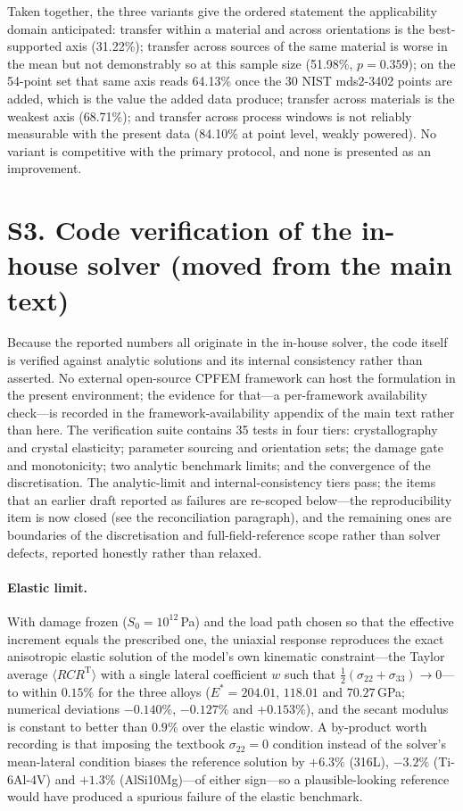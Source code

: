 \documentclass[12pt,a4paper,twocolumn]{article}
\begin{document}
Taken together, the three variants give the ordered statement the applicability domain anticipated:
transfer within a material and across orientations is the best-supported axis (31.22\%); transfer across
sources of the same material is worse in the mean but not demonstrably so at this sample size (51.98\%,
$p = 0.359$); on the 54-point set that same axis reads 64.13\% once the 30 NIST mds2-3402 points are added, which is the value the added data produce; transfer across materials is the weakest axis (68.71\%); and transfer across process windows
is not reliably measurable with the present data (84.10\% at point level, weakly powered). No variant is
competitive with the primary protocol, and none is presented as an improvement.

\section*{S3. Code verification of the in-house solver (moved from the main text)}

Because the reported numbers all originate in the in-house solver, the code itself is verified against
analytic solutions and its internal consistency rather than asserted. No external open-source CPFEM
framework can host the formulation in the present environment; the evidence for that---a per-framework
availability check---is recorded in the framework-availability appendix of the main text rather than here.
The verification suite contains 35 tests in four tiers: crystallography and crystal elasticity; parameter
sourcing and orientation sets; the damage gate and monotonicity; two analytic benchmark limits; and the
convergence of the discretisation. The analytic-limit and internal-consistency tiers pass; the items that an
earlier draft reported as failures are re-scoped below---the reproducibility item is now closed (see the
reconciliation paragraph), and the remaining ones are boundaries of the discretisation and full-field-reference
scope rather than solver defects, reported honestly rather than relaxed.

\paragraph{Elastic limit.} With damage frozen ($S_0 = 10^{12}$\,Pa) and the load path chosen so that the
effective increment equals the prescribed one, the uniaxial response reproduces the exact anisotropic
elastic solution of the model's own kinematic constraint---the Taylor average $\langle RCR^{\mathrm T}\rangle$
with a single lateral coefficient $w$ such that $\tfrac12(\sigma_{22}+\sigma_{33}) \to 0$---to within
$0.15\%$ for the three alloys ($E^{*} = 204.01$, $118.01$ and $70.27$\,GPa; numerical deviations
$-0.140\%$, $-0.127\%$ and $+0.153\%$), and the secant modulus is constant to better than $0.9\%$ over
the elastic window. A by-product worth recording is that imposing the textbook $\sigma_{22} = 0$
condition instead of the solver's mean-lateral condition biases the reference solution by $+6.3\%$
(316L), $-3.2\%$ (Ti-6Al-4V) and $+1.3\%$ (AlSi10Mg)---of either sign---so a plausible-looking reference
would have produced a spurious failure of the elastic benchmark.
\end{document}
